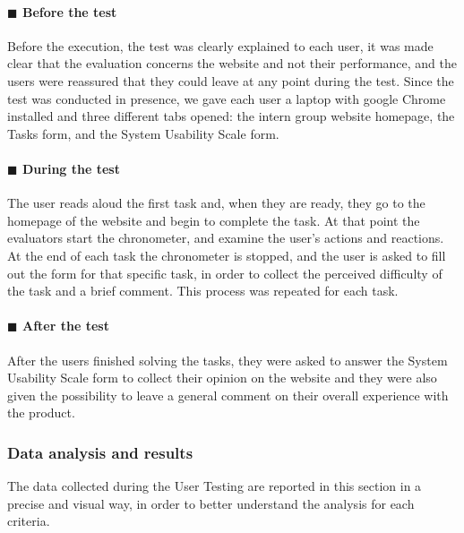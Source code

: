 \documentclass[11pt]{article} %
\begin{document}
\paragraph{$\blacksquare$ Before the test}
Before the execution, the test was clearly explained to each user, it was made clear that the evaluation concerns the website and not their performance, and the users were reassured that they could leave at any point during the test.
Since the test was conducted in presence, we gave each user a laptop with google Chrome installed and three different tabs opened: the intern group website homepage, the Tasks form, and the System Usability Scale form.

\paragraph{$\blacksquare$ During the test}
The user reads aloud the first task and, when they are ready, they go to the homepage of the website and begin to complete the task. At that point the evaluators start the chronometer, and examine the user’s actions and reactions. At the end of each task the chronometer is stopped, and the user is asked to fill out the form for that specific task, in order to collect the perceived difficulty of the task and a brief comment. This process was repeated for each task.

\paragraph{$\blacksquare$ After the test}
After the users finished solving the tasks, they were asked to answer the System Usability Scale form to collect their opinion on the website and they were also given the possibility to leave a general comment on their overall experience with the product.

\subsubsection{Data analysis and results}
The data collected during the User Testing are reported in this section in a precise and visual way, in order to better understand the analysis for each criteria.
\end{document}
